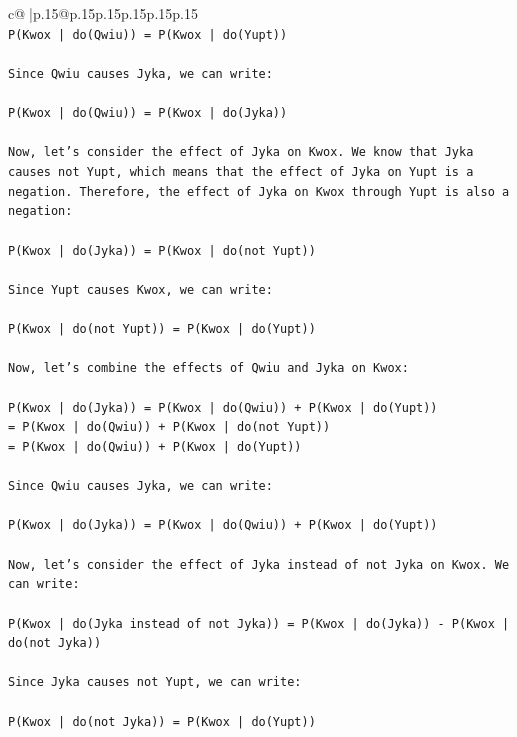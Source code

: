 \documentclass{article}
\begin{document}
{\begin{supertabular}{c@{$\;$}|p{.15\linewidth}@{}p{.15\linewidth}p{.15\linewidth}p{.15\linewidth}p{.15\linewidth}p{.15\linewidth}}
{{{\\ 
\texttt{P(Kwox | do(Qwiu)) = P(Kwox | do(Yupt))} \\
\\ 
\texttt{Since Qwiu causes Jyka, we can write:} \\
\\ 
\texttt{P(Kwox | do(Qwiu)) = P(Kwox | do(Jyka))} \\
\\ 
\texttt{Now, let's consider the effect of Jyka on Kwox. We know that Jyka causes not Yupt, which means that the effect of Jyka on Yupt is a negation. Therefore, the effect of Jyka on Kwox through Yupt is also a negation:} \\
\\ 
\texttt{P(Kwox | do(Jyka)) = P(Kwox | do(not Yupt))} \\
\\ 
\texttt{Since Yupt causes Kwox, we can write:} \\
\\ 
\texttt{P(Kwox | do(not Yupt)) = P(Kwox | do(Yupt))} \\
\\ 
\texttt{Now, let's combine the effects of Qwiu and Jyka on Kwox:} \\
\\ 
\texttt{P(Kwox | do(Jyka)) = P(Kwox | do(Qwiu)) + P(Kwox | do(Yupt))} \\
\texttt{= P(Kwox | do(Qwiu)) + P(Kwox | do(not Yupt))} \\
\texttt{= P(Kwox | do(Qwiu)) + P(Kwox | do(Yupt))} \\
\\ 
\texttt{Since Qwiu causes Jyka, we can write:} \\
\\ 
\texttt{P(Kwox | do(Jyka)) = P(Kwox | do(Qwiu)) + P(Kwox | do(Yupt))} \\
\\ 
\texttt{Now, let's consider the effect of Jyka instead of not Jyka on Kwox. We can write:} \\
\\ 
\texttt{P(Kwox | do(Jyka instead of not Jyka)) = P(Kwox | do(Jyka)) {-} P(Kwox | do(not Jyka))} \\
\\ 
\texttt{Since Jyka causes not Yupt, we can write:} \\
\\ 
\texttt{P(Kwox | do(not Jyka)) = P(Kwox | do(Yupt))} \\
\\ 
}}}
\end{supertabular}}
\end{document}

